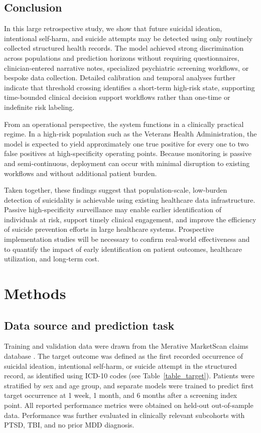 \documentclass[onecolumn, compsoc,11pt]{IEEEtran}
\begin{document}
\subsection*{Conclusion}

In this large retrospective study, we show that future suicidal ideation, intentional self-harm, and suicide attempts may be detected using only routinely collected structured health records. The model achieved strong discrimination across populations and prediction horizons without requiring questionnaires, clinician-entered narrative notes, specialized psychiatric screening workflows, or bespoke data collection. Detailed calibration and temporal analyses further indicate that threshold crossing identifies a short-term high-risk state, supporting time-bounded clinical decision support workflows rather than one-time or indefinite risk labeling.

From an operational perspective, the system functions in a clinically practical regime. In a high-risk population such as the Veterans Health Administration, the model is expected to yield approximately one true positive for every one to two false positives at high-specificity operating points. Because monitoring is passive and semi-continuous, deployment can occur with minimal disruption to existing workflows and without additional patient burden.

Taken together, these findings suggest that population-scale, low-burden detection of suicidality is achievable using existing healthcare data infrastructure. Passive high-specificity surveillance may enable earlier identification of individuals at risk, support timely clinical engagement, and improve the efficiency of suicide prevention efforts in large healthcare systems. Prospective implementation studies will be necessary to confirm real-world effectiveness and to quantify the impact of early identification on patient outcomes, healthcare utilization, and long-term cost.



\section*{Methods}

\subsection*{Data source and prediction task}

Training and validation data were drawn from the Merative MarketScan claims database \cite{hansen2017truven}. The target outcome was defined as the first recorded occurrence of suicidal ideation, intentional self-harm, or suicide attempt in the structured record, as identified using ICD-10 codes (see Table~\ref{table_target}).
Patients were stratified by sex and age group, and separate models were trained to predict first target occurrence at 1 week, 1 month, and 6 months after a screening index point. All reported performance metrics were obtained on held-out out-of-sample data. Performance was further evaluated in clinically relevant subcohorts with PTSD, TBI, and no prior MDD diagnosis.
\end{document}
